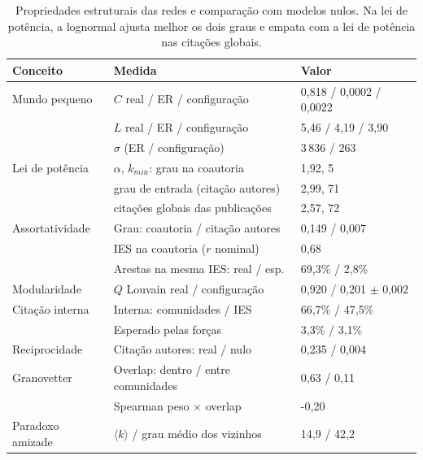 \begin{table}[htbp]
\centering
\small
\caption{Propriedades estruturais das redes e comparação com modelos nulos. Na lei de potência, a lognormal ajusta melhor os dois graus e empata com a lei de potência nas citações globais.}
\label{tab:propriedades}
\begin{tabular}{lll}
\hline
Conceito & Medida & Valor \\
\hline
Mundo pequeno & $C$ real / ER / configuração & 0{,}818 / 0{,}0002 / 0{,}0022 \\
 & $L$ real / ER / configuração & 5{,}46 / 4{,}19 / 3{,}90 \\
 & $\sigma$ (ER / configuração) & 3\,836 / 263 \\
Lei de potência & $\alpha$, $k_{min}$: grau na coautoria & 1{,}92, 5 \\
 & grau de entrada (citação autores) & 2{,}99, 71 \\
 & citações globais das publicações & 2{,}57, 72 \\
Assortatividade & Grau: coautoria / citação autores & 0{,}149 / 0{,}007 \\
 & IES na coautoria ($r$ nominal) & 0{,}68 \\
 & Arestas na mesma IES: real / esp. & 69{,}3\% / 2{,}8\% \\
Modularidade & $Q$ Louvain real / configuração & 0{,}920 / 0{,}201 $\pm$ 0{,}002 \\
Citação interna & Interna: comunidades / IES & 66{,}7\% / 47{,}5\% \\
 & Esperado pelas forças & 3{,}3\% / 3{,}1\% \\
Reciprocidade & Citação autores: real / nulo & 0{,}235 / 0{,}004 \\
Granovetter & Overlap: dentro / entre comunidades & 0{,}63 / 0{,}11 \\
 & Spearman peso $\times$ overlap & -0{,}20 \\
Paradoxo amizade & $\langle k\rangle$ / grau médio dos vizinhos & 14{,}9 / 42{,}2 \\
\hline
\end{tabular}
\end{table}
